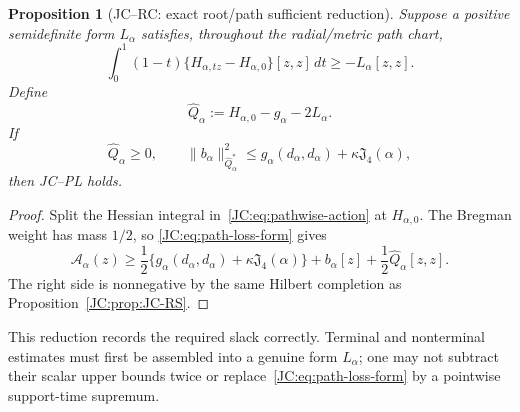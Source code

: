 \documentclass[11pt]{amsart}
\providecommand{\mathscr}{\mathcal}
\numberwithin{equation}{section}
\newtheorem{proposition}[theorem]{Proposition}
\theoremstyle{definition}
\theoremstyle{remark}
\newcommand{\Jfour}{\mathfrak J_4}
\providecommand{\mathscr}[1]{\mathcal{#1}}
\begin{document}
\begin{proposition}[JC--RC: exact root/path sufficient reduction]
\label{JC:prop:JC-RC}
Suppose a positive semidefinite form $L_\alpha$ satisfies, throughout the
radial/metric path chart,
\begin{equation}\label{JC:eq:path-loss-form}
 \int_0^1(1-t)
 \{H_{\alpha,tz}-H_{\alpha,0}\}[z,z]\,dt
 \ge-L_\alpha[z,z].
\end{equation}
Define
\begin{equation}\label{JC:eq:root-after-path-loss}
 \widehat Q_\alpha:=H_{\alpha,0}-g_\alpha-2L_\alpha.
\end{equation}
If
\begin{equation}\label{JC:eq:root-path-Schur}
 \widehat Q_\alpha\ge0,
 \qquad
 \|b_\alpha\|_{\widehat Q_\alpha^*}^2
 \le g_\alpha(d_\alpha,d_\alpha)+\kappa\Jfour(\alpha),
\end{equation}
then JC--PL holds.
\end{proposition}

\begin{proof}
Split the Hessian integral in~\eqref{JC:eq:pathwise-action} at
$H_{\alpha,0}$.  The Bregman weight has mass $1/2$, so
\eqref{JC:eq:path-loss-form} gives
\[
 \mathscr A_\alpha(z)
 \ge\frac12\{g_\alpha(d_\alpha,d_\alpha)
                 +\kappa\Jfour(\alpha)\}
     +b_\alpha[z]
     +\frac12\widehat Q_\alpha[z,z].
\]
The right side is nonnegative by the same Hilbert completion as
Proposition~\ref{JC:prop:JC-RS}.
\end{proof}

This reduction records the required slack correctly.  Terminal and
nonterminal estimates must first be assembled into a genuine form
$L_\alpha$; one may not subtract their scalar upper bounds twice or
replace~\eqref{JC:eq:path-loss-form} by a pointwise support-time supremum.
\end{document}

